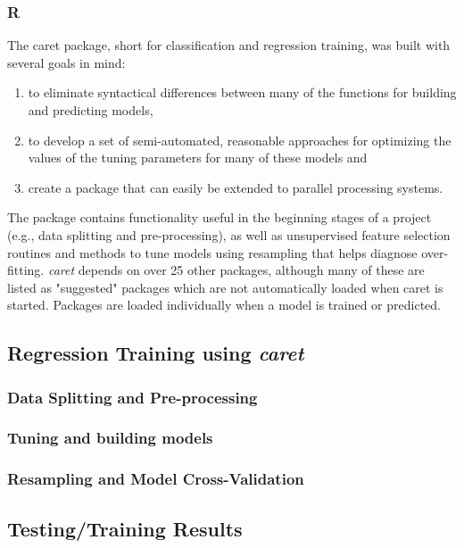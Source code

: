 \documentclass[letterpaper,12pt,titlepage,oneside,final]{report}
\begin{document}
            \subsubsection {R}
                The caret package, short for classification and regression training, was built with several goals in mind:
                \begin{enumerate}
                    \item{to eliminate syntactical differences between many of the functions for building and predicting models,}
                    \item{to develop a set of semi-automated, reasonable approaches for optimizing the values of the tuning parameters for many of these models and}
                    \item{create a package that can easily be extended to parallel processing systems.}
                \end{enumerate}
                The package contains functionality useful in the beginning stages of a project (e.g., data splitting and pre-processing), as well as unsupervised feature selection routines and methods to tune models using resampling that helps diagnose over-fitting. \textit{caret} depends on over 25 other packages, although many of these are listed as "suggested" packages which are not automatically loaded when caret is started. Packages are loaded individually when a model is trained or predicted.

        \subsection {Regression Training using \textit{caret}}


            \subsubsection{Data Splitting and Pre-processing}

            \subsubsection{Tuning and building models}

            \subsubsection {Resampling and Model Cross-Validation}
            \clearpage

        \subsection {Testing/Training Results}
\end{document}
